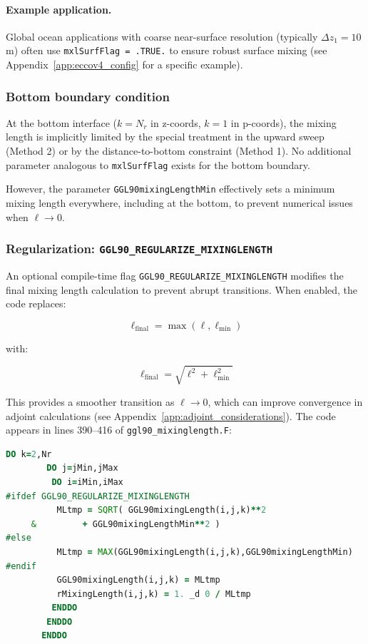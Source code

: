 \documentclass[12pt,letterpaper]{article}
\begin{document}
\paragraph{Example application.} Global ocean applications with coarse near-surface resolution (typically $\Delta z_1 = 10$ m) often use \verb|mxlSurfFlag = .TRUE.| to ensure robust surface mixing (see Appendix~\ref{app:eccov4_config} for a specific example).

\subsubsection{Bottom boundary condition}

At the bottom interface ($k = N_r$ in z-coords, $k = 1$ in p-coords), the mixing length is implicitly limited by the special treatment in the upward sweep (Method 2) or by the distance-to-bottom constraint (Method 1). No additional parameter analogous to \verb|mxlSurfFlag| exists for the bottom boundary.

However, the parameter \verb|GGL90mixingLengthMin| effectively sets a minimum mixing length everywhere, including at the bottom, to prevent numerical issues when $\ell \to 0$.

\subsubsection{Regularization: \texttt{GGL90\_REGULARIZE\_MIXINGLENGTH}}

An optional compile-time flag \verb|GGL90_REGULARIZE_MIXINGLENGTH| modifies the final mixing length calculation to prevent abrupt transitions. When enabled, the code replaces:

\begin{equation}
\ell_{\text{final}} = \max(\ell, \ell_{\text{min}})
\end{equation}

with:

\begin{equation}
\ell_{\text{final}} = \sqrt{ \ell^2 + \ell_{\text{min}}^2 }
\end{equation}

This provides a smoother transition as $\ell \to 0$, which can improve convergence in adjoint calculations (see Appendix~\ref{app:adjoint_considerations}). The code appears in lines 390--416 of \verb|ggl90_mixinglength.F|:

\begin{lstlisting}[language=Fortran,caption={(ggl90\_mixinglength.F:L402--415) Final mixing length with optional regularization}]
       DO k=2,Nr
        DO j=jMin,jMax
         DO i=iMin,iMax
#ifdef GGL90_REGULARIZE_MIXINGLENGTH
          MLtmp = SQRT( GGL90mixingLength(i,j,k)**2
     &         + GGL90mixingLengthMin**2 )
#else
          MLtmp = MAX(GGL90mixingLength(i,j,k),GGL90mixingLengthMin)
#endif
          GGL90mixingLength(i,j,k) = MLtmp
          rMixingLength(i,j,k) = 1. _d 0 / MLtmp
         ENDDO
        ENDDO
       ENDDO
\end{lstlisting}
\end{document}
